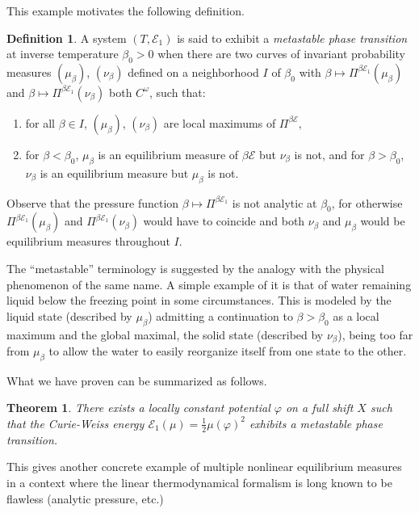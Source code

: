 \documentclass[10pt]{amsart}
\theoremstyle{definition}\newtheorem{defi}[theo]{Definition}\newtheorem{rema}[theo]{Remark}\newtheorem{exam}[theo]{Example}\newtheorem{exem}[theo]{Example}\newtheorem{nota}[theo]{Notation}
\theoremstyle{plain}
\newtheorem{theol}{Theorem}
\theoremstyle{plain}
\newcommand\NLP{\Pi}
\newcommand{\pot}{\varphi}
\newcommand*\8{\infty}
\newcommand{\En}{\mathcal{E}}
\newcommand*{\romanenumi}{\renewcommand*{\theenumi}{\roman{enumi}}}
\begin{document}
This example motivates the following definition.


\begin{defi}
A system $(T,\En_1)$ is said to exhibit a \emph{metastable phase transition} at inverse temperature $\beta_0>0$ when there are two curves of invariant probability measures $(\mu_\beta)$, $(\nu_\beta)$ defined on a neighborhood $I$ of $\beta_0$ with $\beta\mapsto \NLP^{\beta\En_1}(\mu_\beta)$ and $\beta \mapsto \NLP^{\beta\En_1}(\nu_\beta)$ both $C^\omega$, such that:
\begin{enumerate}\romanenumi
\item for all $\beta\in I$, $(\mu_\beta)$, $(\nu_\beta)$ are local maximums of $\NLP^{\beta\En}$,
\item for $\beta<\beta_0$, $\mu_\beta$ is an equilibrium measure of $\beta\En$ but $\nu_\beta$ is not, and for $\beta>\beta_0$, $\nu_\beta$ is an equilibrium measure but $\mu_\beta$ is not.
\end{enumerate}
\end{defi}

Observe that the pressure function $\beta\mapsto \NLP^{\beta\En_1}$ is not analytic at $\beta_0$, for otherwise $\NLP^{\beta\En_1}(\mu_\beta)$ and $\NLP^{\beta\En_1}(\nu_\beta)$ would have to coincide and both $\nu_\beta$ and $\mu_\beta$ would be equilibrium measures throughout $I$.

The ``metastable'' terminology is suggested by the analogy with the physical phenomenon of the same name. A simple example of it is that of water remaining liquid below the freezing point in some circumstances. This is modeled by the liquid state (described by $\mu_\beta$) admitting a continuation to $\beta>\beta_0$ as a local maximum and the global maximal, the solid state (described by $\nu_\beta$), being too far from $\mu_\beta$ to allow the water to easily reorganize itself from one state to the other. 


What we have proven can be summarized as follows.

\begin{theol}\label{th-metastable}
There exists a locally constant potential $\pot$ on a full shift $X$ such that the Curie-Weiss energy $\En_1(\mu) = \frac12 \mu(\pot)^2$ exhibits a metastable phase transition.
\end{theol}

This gives another concrete example of multiple nonlinear equilibrium measures in a context where the linear thermodynamical formalism is long known to be flawless (analytic pressure, etc.)
\end{document}
